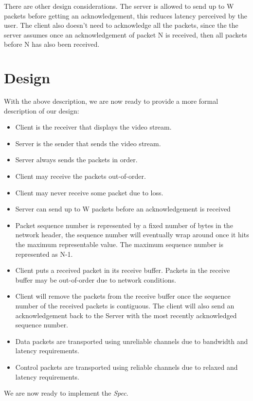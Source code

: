 There are other design considerations. The server is allowed to send up to W
packets before getting an acknowledgement, this reduces latency perceived by the
user. The client also doesn't need to acknowledge all the packets, since the
the server assumes once an acknowledgement of packet N is received, then all packets
before N has also been received.

\section{Design}

With the above description, we are now ready to provide a more formal
description of our design:

\begin{itemize}
    \item Client is the receiver that displays the video stream.
    \item Server is the sender that sends the video stream.
    \item Server always sends the packets in order.
    \item Client may receive the packets out-of-order.
    \item Client may never receive some packet due to loss.
    \item Server can send up to W packets before an acknowledgement is received
    \item Packet sequence number is represented by a fixed number of bytes in
    the network header, the sequence number will eventually wrap around once it
    hits the maximum representable value. The maximum sequence number is
    represented as N-1. 
    \item Client puts a received packet in its receive buffer. Packets in the 
    receive buffer may be out-of-order due to network conditions.
    \item Client will remove the packets from the receive buffer once the
    sequence number of the received packets is contiguous. The client will also
    send an acknowledgement back to the Server with the most recently
    acknowledged sequence number.
    \item Data packets are transported using unreliable channels due to
    bandwidth and latency requirements.
    \item Control packets are transported using reliable channels due to relaxed 
    and latency requirements. 
\end{itemize}

We are now ready to implement the \textit{Spec}. 


